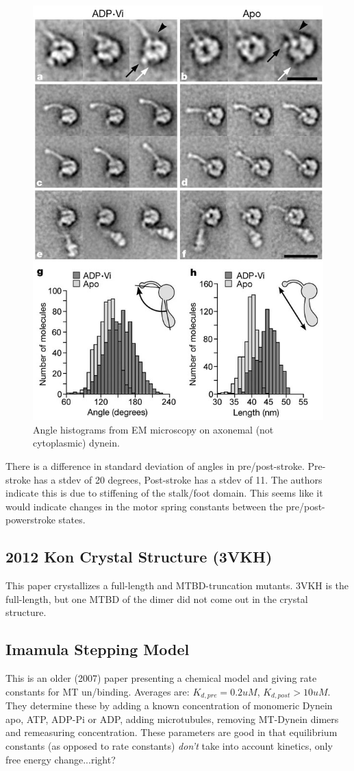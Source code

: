 \documentclass[10pt]{article} %
\begin{document}
\begin{figure}[h!]
  \centering
  \includegraphics[width=.45\textwidth]{../figures/axonemal-motor-angles.jpg}
  \caption{Angle histograms from EM microscopy on axonemal (not cytoplasmic) dynein.}
  \label{fig:EM-angles-burgess}
\end{figure}


There is a difference in standard deviation of angles in pre/post-stroke. Pre-stroke has a stdev of 20 degrees, Post-stroke has a stdev of 11. The authors indicate this is due to stiffening of the stalk/foot domain. This seems like it would indicate changes in the motor spring constants between the pre/post-powerstroke states.

\subsection{2012 Kon Crystal Structure (3VKH)}
This paper crystallizes a full-length and MTBD-truncation mutants. 3VKH is the full-length, but one MTBD of the dimer did not come out in the crystal structure.

\subsection{Imamula Stepping Model}
This is an older (2007) paper presenting a chemical model and giving rate constants for MT un/binding. Averages are: $K_{d,pre} = 0.2uM$, $K_{d,post} > 10uM$. They determine these by adding a known concentration of monomeric Dynein apo, ATP, ADP-Pi or ADP, adding microtubules, removing MT-Dynein dimers and remeasuring concentration. These parameters are good in that equilibrium constants (as opposed to rate constants) \textit{don't} take into account kinetics, only free energy change...right?\\
\end{document}

